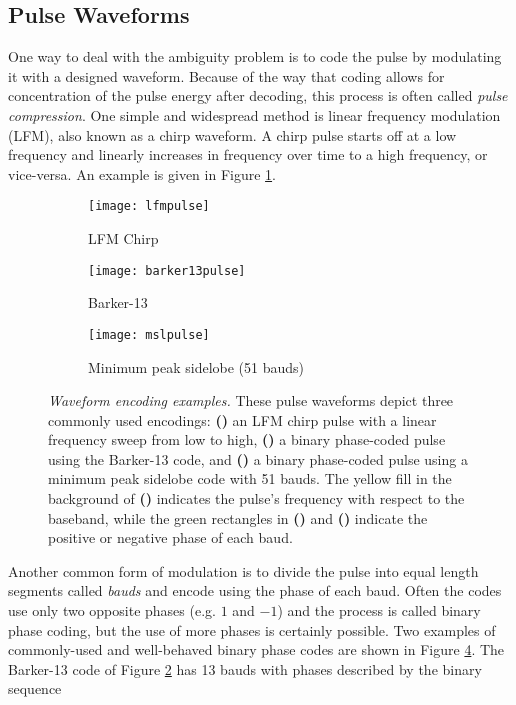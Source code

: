 \subsection{Pulse Waveforms}
One way to deal with the ambiguity problem is to code the pulse by modulating it with a designed waveform. Because of the way that coding allows for concentration of the pulse energy after decoding, this process is often called \emph{pulse compression}. One simple and widespread method is linear frequency modulation (LFM), also known as a chirp waveform. A chirp pulse starts off at a low frequency and linearly increases in frequency over time to a high frequency, or vice-versa. An example is given in Figure \ref{fig:lfm_chirp}.
\begin{figure}[tpb]
 \centering
 \begin{subfigure}{\textwidth}
  \centering
  \texttt{[image: lfmpulse]}
  \caption{LFM Chirp}
  \label{fig:lfm_chirp}
 \end{subfigure}
 
 \vspace{\baselineskip}
 \begin{subfigure}{\textwidth}
  \centering
  \texttt{[image: barker13pulse]}
  \caption{Barker-13}
  \label{fig:barker13_pulse}
 \end{subfigure}
 
 \vspace{\baselineskip}
 \begin{subfigure}{\textwidth}
  \centering
  \texttt{[image: mslpulse]}
  \caption{Minimum peak sidelobe (51 bauds)}
  \label{fig:msl_pulse}
 \end{subfigure}
 \caption[Waveform encoding examples]{\emph{Waveform encoding examples.} These pulse waveforms depict three commonly used encodings: \textbf{()} an LFM chirp pulse with a linear frequency sweep from low to high, \textbf{()} a binary phase-coded pulse using the Barker-13 code, and \textbf{()} a binary phase-coded pulse using a minimum peak sidelobe code with 51 bauds. The yellow fill in the background of \textbf{()} indicates the pulse's frequency with respect to the baseband, while the green rectangles in \textbf{()} and \textbf{()} indicate the positive or negative phase of each baud.}
 \label{fig:waveform_encodings}
\end{figure}%
Another common form of modulation is to divide the pulse into equal length segments called \emph{bauds} and encode using the phase of each baud. Often the codes use only two opposite phases (e.g. $1$ and $-1$) and the process is called binary phase coding, but the use of more phases is certainly possible. Two examples of commonly-used and well-behaved binary phase codes are shown in Figure \ref{fig:waveform_encodings}. The Barker-13 code of Figure \ref{fig:barker13_pulse} has 13 bauds with phases described by the binary sequence
